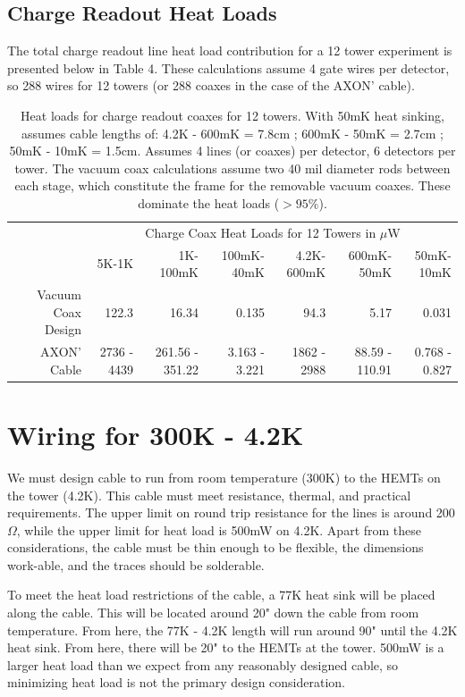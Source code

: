 \documentclass{article}
\begin{document}
\subsection{Charge Readout Heat Loads}

The total charge readout line heat load contribution for a 12 tower experiment is presented below in Table 4. These calculations assume 4 gate wires per detector, so 288 wires for 12 towers (or 288 coaxes in the case of the AXON' cable).

\begin{table}[h]
\begin{threeparttable}
\begin{tabular}{rrrr|rrr}
\toprule
 & \multicolumn{6}{c}{Charge Coax Heat Loads for 12 Towers in $\mu$W} \\
  & 5K-1K & 1K-100mK & 100mK-40mK & 4.2K-600mK & 600mK-50mK & 50mK-10mK \\
 \cmidrule(r){2-7}
   Vacuum Coax Design & 122.3 & 16.34 & 0.135 & 94.3 & 5.17 & 0.031 \\
   AXON' Cable & 2736 - 4439 & 261.56 - 351.22 & 3.163 - 3.221 & 1862 - 2988 & 88.59 - 110.91 & 0.768 - 0.827 \\
  \bottomrule
\end{tabular}
\end{threeparttable}
\caption{Heat loads for charge readout coaxes for 12 towers. With 50mK heat sinking, assumes cable lengths of: 4.2K - 600mK = 7.8cm ; 600mK - 50mK = 2.7cm ; 50mK - 10mK = 1.5cm. Assumes 4 lines (or coaxes) per detector, 6 detectors per tower. The vacuum coax calculations assume two 40 mil diameter rods between each stage, which constitute the frame for the removable vacuum coaxes. These dominate the heat loads ($>95\%$).}
\end{table}

\section{Wiring for 300K - 4.2K}

We must design cable to run from room temperature (300K) to the HEMTs on the tower (4.2K). This cable must meet resistance, thermal, and practical requirements. The upper limit on round trip resistance for the lines is around 200$\Omega$, while the upper limit for heat load is 500mW on 4.2K. Apart from these considerations, the cable must be thin enough to be flexible, the dimensions work-able, and the traces should be solderable\footnotemark.

To meet the heat load restrictions of the cable, a 77K heat sink will be placed along the cable. This will be located around 20" down the cable from room temperature. From here, the 77K - 4.2K length will run around 90" until the 4.2K heat sink. From here, there will be 20" to the HEMTs at the tower. 500mW is a larger heat load than we expect from any reasonably designed cable, so minimizing heat load is not the primary design consideration.
\end{document}
